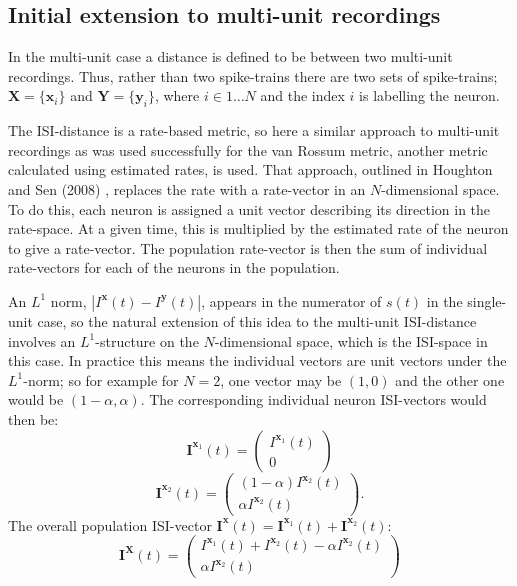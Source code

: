 \subsection{Initial extension to multi-unit recordings}

In the multi-unit case a distance is defined to be between two multi-unit recordings.  Thus, rather than two spike-trains there are two sets of spike-trains; $\mathbf{X}=\{ \mathbf{x}_i \}$ and $ \mathbf{Y}=\{ \mathbf{y}_i \}$, where $i \in 1\ldots N$ and the index $i$ is labelling the neuron.

The ISI-distance is a rate-based metric, so here a similar approach to multi-unit recordings as was used successfully for the van Rossum metric, another metric calculated using estimated rates, is used.  That approach, outlined in Houghton and Sen (2008) \cite{HoughtonSen2008}, replaces the rate with a rate-vector in an $N$-dimensional space.  To do this, each neuron is assigned a unit vector describing its direction in the rate-space.  At a given time, this is multiplied by the estimated rate of the neuron to give a rate-vector. The population rate-vector is then the sum of individual rate-vectors for each of the neurons in the population.  

An $L^1$ norm, $| I^{\mathbf{x}}(t) - I^{\mathbf{y}}(t) | $, appears in the numerator of $s(t)$ in the single-unit case, so the natural extension of this idea to the multi-unit ISI-distance involves an $L^1$-structure on the $N$-dimensional space, which is the ISI-space in this case. In practice this means the individual vectors are unit vectors under the $L^1$-norm; so for example for $N=2$, one vector may be $(1,0)$ and the other one would be $(1-\alpha,\alpha)$.  The corresponding individual neuron ISI-vectors would then be: 
\begin{equation}
\mathbf{I}^{\mathbf{x}_1}(t)=\begin{pmatrix}I^{\mathbf{x}_1}(t)\\0\end{pmatrix}
\end{equation}
\begin{equation}
\mathbf{I}^{\mathbf{x}_2}(t) = \begin{pmatrix} (1-\alpha)I^{\mathbf{x}_2}(t)\\ \alpha I^{\mathbf{x}_2}(t)\end{pmatrix}.
\end{equation}
The overall population ISI-vector $\mathbf{I^x}(t) = \mathbf{I}^{\mathbf{x}_1}(t) + \mathbf{I}^{\mathbf{x}_2}(t)$:
\begin{equation}
\mathbf{I^X}(t) = \begin{pmatrix} I^{\mathbf{x}_1}(t) + I^{\mathbf{x}_2}(t) - \alpha I^{\mathbf{x}_2}(t) \\ \alpha I^{\mathbf{x}_2}(t) \end{pmatrix}
\end{equation}

